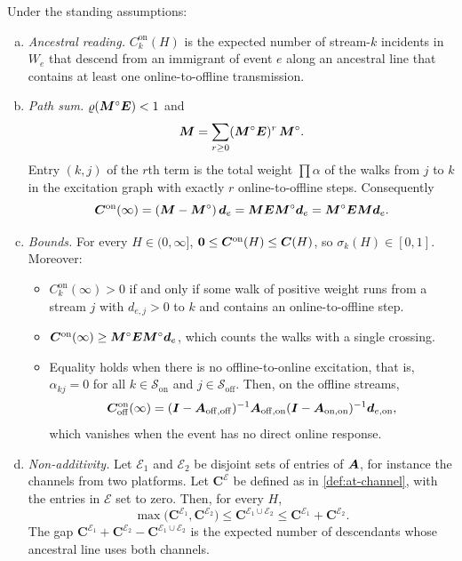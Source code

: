 \begin{proposition}\label{prop:at-channel}
Under the standing assumptions:
\begin{enumerate}[(a)]
  \item \emph{Ancestral reading.} $C^{\mathrm{on}}_k(H)$ is the expected number of
  stream-$k$ incidents in $W_e$ that descend from an immigrant of event $e$ along an
  ancestral line that contains at least one online-to-offline transmission.
  \item \emph{Path sum.} $\varrho(\bm{M}^\circ\bm E)<1$ and
  \begin{equation}\label{eq:at-pathsum}
    \bm{M}=\sum_{r\ge0}(\bm{M}^\circ\bm E)^r\,\bm{M}^\circ .
  \end{equation}
  Entry $(k,j)$ of the $r$th term is the total weight $\prod\alpha$ of the walks from
  $j$ to $k$ in the excitation graph with exactly $r$ online-to-offline steps.
  Consequently
  \begin{equation}\label{eq:at-chan-inf}
    \bm C^{\mathrm{on}}(\infty)=(\bm{M}-\bm{M}^\circ)\,\bm d_e
    =\bm{M}\bm E\bm{M}^\circ\bm d_e=\bm{M}^\circ\bm E\bm{M}\bm d_e .
  \end{equation}
  \item \emph{Bounds.} For every $H\in(0,\infty]$, $\mathbf{0}\le\bm C^{\mathrm{on}}(H)\le\bm C(H)$,
  so $\sigma_k(H)\in[0,1]$. Moreover:
  \begin{itemize}
    \item $C^{\mathrm{on}}_k(\infty)>0$ if and only if some walk of positive weight
    runs from a stream $j$ with $d_{e,j}>0$ to $k$ and contains an online-to-offline
    step.
    \item $\bm C^{\mathrm{on}}(\infty)\ge\bm{M}^\circ\bm E\bm{M}^\circ\bm d_e$, which
    counts the walks with a single crossing.
    \item Equality holds when there is no offline-to-online excitation, that is,
    $\alpha_{kj}=0$ for all $k\in\mathcal S_{\mathrm{on}}$ and
    $j\in\mathcal S_{\mathrm{off}}$. Then, on the offline streams,
    \begin{equation}\label{eq:at-chan-nofb}
      \bm C^{\mathrm{on}}_{\mathrm{off}}(\infty)
      =(\bm{I}-\bm{A}_{\mathrm{off},\mathrm{off}})^{-1}\bm{A}_{\mathrm{off},\mathrm{on}}
      (\bm{I}-\bm{A}_{\mathrm{on},\mathrm{on}})^{-1}\bm d_{e,\mathrm{on}},
    \end{equation}
    which vanishes when the event has no direct online response.
  \end{itemize}
  \item \emph{Non-additivity.} Let $\mathcal E_1$ and $\mathcal E_2$ be disjoint sets of
  entries of $\bm{A}$, for instance the channels from two platforms. Let
  $\bm C^{\mathcal E}$ be defined as in \cref{def:at-channel}, with the entries in
  $\mathcal E$ set to zero. Then, for every $H$,
  \[
    \max\bigl(\bm C^{\mathcal E_1},\bm C^{\mathcal E_2}\bigr)\le\bm C^{\mathcal E_1\cup\mathcal E_2}
    \le\bm C^{\mathcal E_1}+\bm C^{\mathcal E_2}.
  \]
  The gap $\bm C^{\mathcal E_1}+\bm C^{\mathcal E_2}-\bm C^{\mathcal E_1\cup\mathcal E_2}$
  is the expected number of descendants whose ancestral line uses both channels.
\end{enumerate}
\end{proposition}

